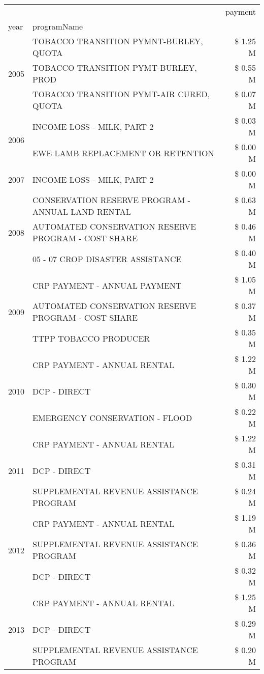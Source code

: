 \begin{tabular}{llr}
\toprule
 &  & payment \\
year & programName &  \\
\midrule
\multirow[t]{3}{*}{2005} & TOBACCO TRANSITION PYMNT-BURLEY, QUOTA & \$ 1.25 M \\
 & TOBACCO TRANSITION PYMT-BURLEY, PROD & \$ 0.55 M \\
 & TOBACCO TRANSITION PYMT-AIR CURED, QUOTA & \$ 0.07 M \\
\cline{1-3}
\multirow[t]{2}{*}{2006} & INCOME LOSS - MILK, PART 2 & \$ 0.03 M \\
 & EWE LAMB REPLACEMENT OR RETENTION & \$ 0.00 M \\
\cline{1-3}
2007 & INCOME LOSS - MILK, PART 2 & \$ 0.00 M \\
\cline{1-3}
\multirow[t]{3}{*}{2008} & CONSERVATION RESERVE PROGRAM - ANNUAL LAND RENTAL & \$ 0.63 M \\
 & AUTOMATED CONSERVATION RESERVE PROGRAM - COST SHARE & \$ 0.46 M \\
 & 05 - 07 CROP DISASTER ASSISTANCE & \$ 0.40 M \\
\cline{1-3}
\multirow[t]{3}{*}{2009} & CRP PAYMENT - ANNUAL PAYMENT & \$ 1.05 M \\
 & AUTOMATED CONSERVATION RESERVE PROGRAM - COST SHARE & \$ 0.37 M \\
 & TTPP TOBACCO PRODUCER & \$ 0.35 M \\
\cline{1-3}
\multirow[t]{3}{*}{2010} & CRP PAYMENT - ANNUAL RENTAL & \$ 1.22 M \\
 & DCP - DIRECT & \$ 0.30 M \\
 & EMERGENCY CONSERVATION - FLOOD & \$ 0.22 M \\
\cline{1-3}
\multirow[t]{3}{*}{2011} & CRP PAYMENT - ANNUAL RENTAL & \$ 1.22 M \\
 & DCP - DIRECT & \$ 0.31 M \\
 & SUPPLEMENTAL REVENUE ASSISTANCE PROGRAM & \$ 0.24 M \\
\cline{1-3}
\multirow[t]{3}{*}{2012} & CRP PAYMENT - ANNUAL RENTAL & \$ 1.19 M \\
 & SUPPLEMENTAL REVENUE ASSISTANCE PROGRAM & \$ 0.36 M \\
 & DCP - DIRECT & \$ 0.32 M \\
\cline{1-3}
\multirow[t]{3}{*}{2013} & CRP PAYMENT - ANNUAL RENTAL & \$ 1.25 M \\
 & DCP - DIRECT & \$ 0.29 M \\
 & SUPPLEMENTAL REVENUE ASSISTANCE PROGRAM & \$ 0.20 M \\

\end{tabular}

